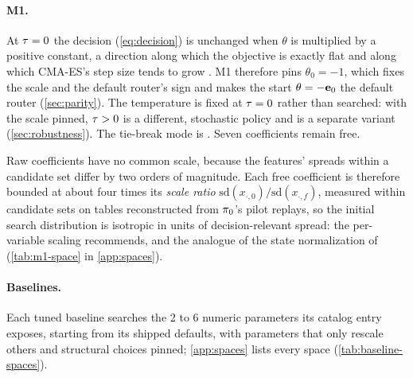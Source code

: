 \paragraph{M1.}
At $\tau = 0$ the decision (\cref{eq:decision}) is unchanged when $\theta$ is multiplied by a
positive constant, a direction along which the objective is exactly flat and along which CMA-ES's
step size tends to grow \citep{hansen2016tutorial}. M1 therefore pins $\theta_0 = -1$, which fixes
the scale and the default router's sign and makes the start $\theta = -\mathbf{e}_{0}$ the default
router (\cref{sec:parity}). The temperature is fixed at $\tau = 0$ rather than searched: with the
scale pinned, $\tau > 0$ is a different, stochastic policy and is a separate variant
(\cref{sec:robustness}). The tie-break mode is . Seven coefficients remain free.

Raw coefficients have no common scale, because the features' spreads within a candidate set
differ by two orders of magnitude. Each free coefficient is therefore bounded at about four times
its \emph{scale ratio} $\mathrm{sd}(x_{\cdot,0})/\mathrm{sd}(x_{\cdot,f})$, measured within
candidate sets on tables reconstructed from $\pi_{0}$'s pilot replays, so the initial search
distribution is isotropic in units of decision-relevant spread: the per-variable scaling
\citet{hansen2016tutorial} recommends, and the analogue of the state normalization of
\citet{mania2018ars} (\cref{tab:m1-space} in \cref{app:spaces}).

\paragraph{Baselines.}
Each tuned baseline searches the 2 to 6 numeric parameters its catalog entry exposes, starting from
its shipped defaults, with parameters that only rescale others and structural choices pinned;
\cref{app:spaces} lists every space (\cref{tab:baseline-spaces}).

